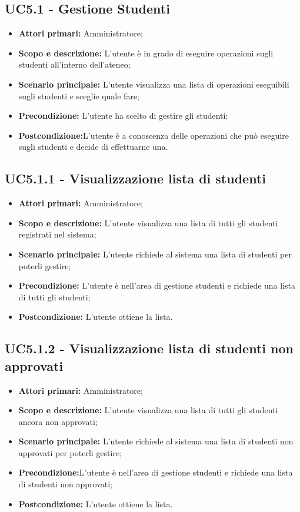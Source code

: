 \documentclass[AnalisiDeiRequisiti.tex]{subfiles}
\begin{document}
\subsection{UC5.1 - Gestione Studenti}
\begin{itemize}
	\item \textbf{Attori primari:} Amministratore;
	\item \textbf{Scopo e descrizione:} L'utente è in grado di eseguire operazioni sugli studenti all'interno dell'ateneo;
	\item \textbf{Scenario principale:} L'utente visualizza una lista di operazioni eseguibili sugli studenti e sceglie quale fare;
	\item \textbf{Precondizione:} L'utente ha scelto di gestire gli studenti; 
	\item \textbf{Postcondizione:}L'utente è a conoscenza delle operazioni che può eseguire sugli studenti e decide di effettuarne una.
\end{itemize}
\subsection{UC5.1.1 - Visualizzazione lista di studenti}
\begin{itemize}
	\item \textbf{Attori primari:} Amministratore;
	\item \textbf{Scopo e descrizione:} L'utente visualizza una lista di tutti gli studenti registrati nel sistema;
	\item \textbf{Scenario principale:} L'utente richiede al sistema una lista di studenti per poterli gestire;
	\item \textbf{Precondizione:} L'utente è nell'area di gestione studenti e richiede una lista di tutti gli studenti; 
	\item \textbf{Postcondizione:} L'utente ottiene la lista.
\end{itemize}
\subsection{UC5.1.2 - Visualizzazione lista di studenti non approvati}
\begin{itemize}
	\item \textbf{Attori primari:} Amministratore;
	\item \textbf{Scopo e descrizione:} L'utente visualizza una lista di tutti gli studenti ancora non approvati;
	\item \textbf{Scenario principale:} L'utente richiede al sistema una lista di studenti non approvati per poterli gestire;
	\item \textbf{Precondizione:}L'utente è nell'area di gestione studenti e richiede una lista di studenti non approvati; 
	\item \textbf{Postcondizione:} L'utente ottiene la lista.
\end{itemize}
\end{document}
